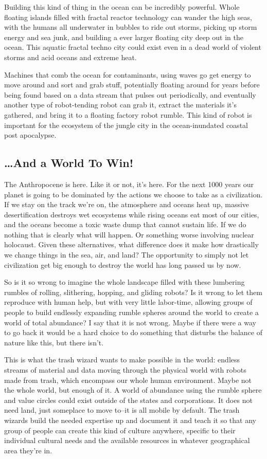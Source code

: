 Building this kind of thing in the ocean can be incredibly powerful.
Whole floating islands filled with fractal reactor technology can wander
the high seas, with the humans all underwater in bubbles to ride out
storms, picking up storm energy and sea junk, and building a ever larger
floating city deep out in the ocean. This aquatic fractal techno city
could exist even in a dead world of violent storms and acid oceans and
extreme heat.

Machines that comb the ocean for contaminants, using waves go get energy
to move around and sort and grab stuff, potentially floating around for
years before being found based on a data stream that pulses out
periodically, and eventually another type of robot-tending robot can
grab it, extract the materials it's gathered, and bring it to a floating
factory robot rumble. This kind of robot is important for the ecosystem
of the jungle city in the ocean-inundated coastal post apocalypse.

\subsection{\ldots{}And a World To Win!}\label{and-a-world-to-win}

The Anthropocene is here. Like it or not, it's here. For the next 1000
years our planet is going to be dominated by the actions we choose to
take as a civilization. If we stay on the track we're on, the atmosphere
and oceans heat up, massive desertification destroys wet ecosystems
while rising oceans eat most of our cities, and the oceans become a
toxic waste dump that cannot sustain life. If we do nothing that is
clearly what will happen. Or something worse involving nuclear
holocaust. Given these alternatives, what difference does it make how
drastically we change things in the sea, air, and land? The opportunity
to simply not let civilization get big enough to destroy the world has
long passed us by now.

So is it so wrong to imagine the whole landscape filled with these
lumbering rumbles of rolling, slithering, hopping, and gliding robots?
Is it wrong to let them reproduce with human help, but with very little
labor-time, allowing groups of people to build endlessly expanding
rumble spheres around the world to create a world of total abundance? I
say that it is not wrong. Maybe if there were a way to go back it would
be a hard choice to do something that disturbs the balance of nature
like this, but there isn't.

This is what the trash wizard wants to make possible in the world:
endless streams of material and data moving through the physical world
with robots made from trash, which encompass our whole human
environment. Maybe not the whole world, but enough of it. A world of
abundance using the rumble sphere and value circles could exist outside
of the states and corporations. It does not need land, just someplace to
move to--it is all mobile by default. The trash wizards build the needed
expertise up and document it and teach it so that any group of people
can create this kind of culture anywhere, specific to their individual
cultural needs and the available resources in whatever geographical area
they're in.
